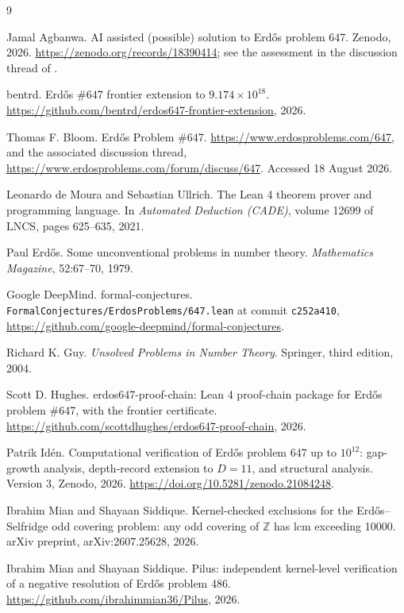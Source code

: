 \documentclass[11pt]{article}
\newcommand{\lean}[1]{\texttt{#1}}
\begin{document}
\begin{thebibliography}{9}

Jamal Agbanwa. AI assisted (possible) solution to Erd\H{o}s problem
647. Zenodo, 2026. \url{https://zenodo.org/records/18390414}; see the
assessment in the discussion thread of \cite{bloom647}.

bentrd. Erd\H{o}s \#647 frontier extension to $9.174 \times 10^{18}$.
\url{https://github.com/bentrd/erdos647-frontier-extension}, 2026.

Thomas F. Bloom. Erd\H{o}s Problem \#647.
\url{https://www.erdosproblems.com/647}, and the associated discussion
thread, \url{https://www.erdosproblems.com/forum/discuss/647}. Accessed
18 August 2026.

Leonardo de Moura and Sebastian Ullrich. The Lean 4 theorem prover and
programming language. In \emph{Automated Deduction (CADE)}, volume
12699 of LNCS, pages 625--635, 2021.

Paul Erd\H{o}s. Some unconventional problems in number theory.
\emph{Mathematics Magazine}, 52:67--70, 1979.

Google DeepMind. formal-conjectures.
\lean{FormalConjectures/ErdosProblems/647.lean} at commit
\lean{c252a410},
\url{https://github.com/google-deepmind/formal-conjectures}.

Richard K. Guy. \emph{Unsolved Problems in Number Theory}. Springer,
third edition, 2004.

Scott D. Hughes. erdos647-proof-chain: Lean 4 proof-chain package for
Erd\H{o}s problem \#647, with the frontier certificate.
\url{https://github.com/scottdhughes/erdos647-proof-chain}, 2026.

Patrik Id\'en. Computational verification of Erd\H{o}s problem 647 up
to $10^{12}$: gap-growth analysis, depth-record extension to $D=11$,
and structural analysis. Version 3, Zenodo, 2026.
\url{https://doi.org/10.5281/zenodo.21084248}.

Ibrahim Mian and Shayaan Siddique. Kernel-checked exclusions for the
Erd\H{o}s--Selfridge odd covering problem: any odd covering of
$\mathbb{Z}$ has lcm exceeding 10000. arXiv preprint, arXiv:2607.25628,
2026.

Ibrahim Mian and Shayaan Siddique. Pilus: independent kernel-level
verification of a negative resolution of Erd\H{o}s problem 486.
\url{https://github.com/ibrahimmian36/Pilus}, 2026.


\end{thebibliography}
\end{document}
